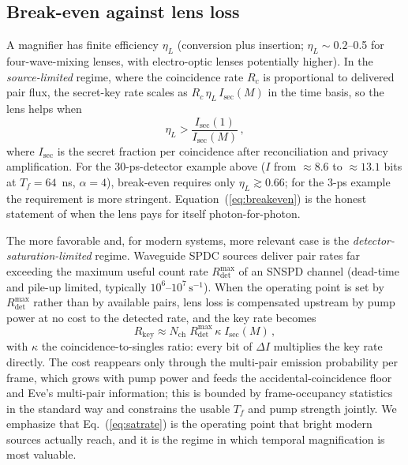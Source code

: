 \documentclass[11pt]{article}
\begin{document}
\subsection{Break-even against lens loss}
\label{sec:breakeven}

A magnifier has finite efficiency $\eta_L$ (conversion plus insertion; $\eta_L \sim 0.2$--0.5 for four-wave-mixing lenses, with electro-optic lenses potentially higher). In the \emph{source-limited} regime, where the coincidence rate $R_c$ is proportional to delivered pair flux, the secret-key rate scales as $R_c\, \eta_L\, I_{\mathrm{sec}}(M)$ in the time basis, so the lens helps when
\begin{equation}
\eta_L > \frac{I_{\mathrm{sec}}(1)}{I_{\mathrm{sec}}(M)}\,,
\label{eq:breakeven}
\end{equation}
where $I_{\mathrm{sec}}$ is the secret fraction per coincidence after reconciliation and privacy amplification. For the 30-ps-detector example above ($I$ from $\approx 8.6$ to $\approx 13.1$ bits at $T_f = 64$~ns, $\alpha = 4$), break-even requires only $\eta_L \gtrsim 0.66$; for the 3-ps example the requirement is more stringent. Equation~(\ref{eq:breakeven}) is the honest statement of when the lens pays for itself photon-for-photon.

The more favorable and, for modern systems, more relevant case is the \emph{detector-saturation-limited} regime. Waveguide SPDC sources deliver pair rates far exceeding the maximum useful count rate $R_{\det}^{\max}$ of an SNSPD channel (dead-time and pile-up limited, typically $10^6$--$10^7\,\mathrm{s}^{-1}$). When the operating point is set by $R_{\det}^{\max}$ rather than by available pairs, lens loss is compensated upstream by pump power at no cost to the detected rate, and the key rate becomes
\begin{equation}
R_{\mathrm{key}} \approx N_{\mathrm{ch}}\; R_{\det}^{\max}\, \kappa \; I_{\mathrm{sec}}(M)\,,
\label{eq:satrate}
\end{equation}
with $\kappa$ the coincidence-to-singles ratio: every bit of $\Delta I$ multiplies the key rate directly. The cost reappears only through the multi-pair emission probability per frame, which grows with pump power and feeds the accidental-coincidence floor and Eve's multi-pair information; this is bounded by frame-occupancy statistics in the standard way \cite{Zhang2014,Zhong2015} and constrains the usable $T_f$ and pump strength jointly. We emphasize that Eq.~(\ref{eq:satrate}) is the operating point that bright modern sources actually reach, and it is the regime in which temporal magnification is most valuable.
\end{document}
